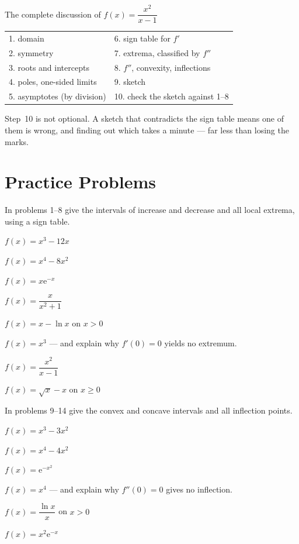 \begin{worked}{The complete discussion of $f(x)=\dfrac{x^{2}}{x-1}$}
\begin{center}\footnotesize
\begin{tabular}{ll}
  \hline
  1. domain & 6. sign table for $f'$\\
  2. symmetry & 7. extrema, classified by $f''$\\
  3. roots and intercepts & 8. $f''$, convexity, inflections\\
  4. poles, one-sided limits & 9. sketch\\
  5. asymptotes (by division) & 10. check the sketch against 1--8\\
  \hline
\end{tabular}
\end{center}
Step~10 is not optional. A sketch that contradicts the sign table means one
of them is wrong, and finding out which takes a minute --- far less than
losing the marks.
\end{worked}

\section{Practice Problems}

In problems 1--8 give the intervals of increase and decrease and all local
extrema, using a sign table.

\begin{problems}
  \item $f(x)=x^{3}-12x$
  \item $f(x)=x^{4}-8x^{2}$
  \item $f(x)=x\mathrm{e}^{-x}$
  \item $f(x)=\dfrac{x}{x^{2}+1}$
  \item $f(x)=x-\ln x$ on $x>0$
  \item $f(x)=x^{3}$ --- and explain why $f'(0)=0$ yields no extremum.
  \item $f(x)=\dfrac{x^{2}}{x-1}$
  \item $f(x)=\sqrt{x}-x$ on $x\ge0$
\end{problems}

In problems 9--14 give the convex and concave intervals and all inflection
points.

\begin{problems}[resume]
  \item $f(x)=x^{3}-3x^{2}$
  \item $f(x)=x^{4}-4x^{2}$
  \item $f(x)=\mathrm{e}^{-x^{2}}$
  \item $f(x)=x^{4}$ --- and explain why $f''(0)=0$ gives no inflection.
  \item $f(x)=\dfrac{\ln x}{x}$ on $x>0$
  \item $f(x)=x^{2}\mathrm{e}^{-x}$
\end{problems}

